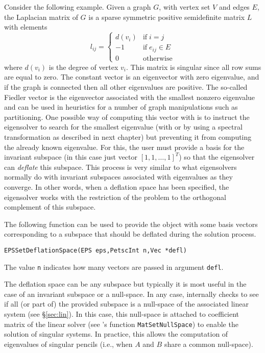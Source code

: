 	Consider the following example. Given a graph $G$, with vertex set $V$ and edges $E$, the Laplacian matrix of $G$ is a sparse symmetric positive semidefinite matrix $L$ with elements
$$l_{ij}=\left\{\begin{array}{cl}
         d(v_i) & \mathrm{if}\;i=j\\
         -1 & \mathrm{if}\;e_{ij}\in E\\
         0&\mathrm{otherwise}
\end{array}\right.$$
where $d(v_i)$ is the degree of vertex $v_i$. This matrix is singular since all row sums are equal to zero. The constant vector is an eigenvector with zero eigenvalue, and if the graph is connected then all other eigenvalues are positive. The so-called Fiedler vector is the eigenvector associated with the smallest nonzero eigenvalue and can be used in heuristics for a number of graph manipulations such as partitioning. One possible way of computing this vector with \slepc is to instruct the eigensolver to search for the smallest eigenvalue (with  or by using a spectral transformation as described in next chapter) but preventing it from computing the already known eigenvalue. For this, the user must provide a basis for the invariant subspace (in this case just vector $[1,1,\ldots,1]^T$) so that the eigensolver can \emph{deflate} this subspace. This process is very similar to what eigensolvers normally do with invariant subspaces associated with eigenvalues as they converge. In other words, when a deflation space has been specified, the eigensolver works with the restriction of the problem to the orthogonal complement of this subspace.

	The following function can be used to provide the  object with some basis vectors corresponding to a subspace that should be deflated during the solution process.
	\begin{Verbatim}[fontsize=\small]
	EPSSetDeflationSpace(EPS eps,PetscInt n,Vec *defl)
	\end{Verbatim}
The value \texttt{n} indicates how many vectors are passed in argument \texttt{defl}.

	The deflation space can be any subspace but typically it is most useful in the case of an invariant subspace or a null-space. In any case, \slepc internally checks to see if all (or part of) the provided subspace is a null-space of the associated linear system (see \S\ref{sec:lin}). In this case, this null-space is attached to coefficient matrix of the linear solver (see \petsc's function \texttt{MatSetNullSpace}) to enable the solution of singular systems. In practice, this allows the computation of eigenvalues of singular pencils (i.e., when $A$ and $B$ share a common null-space).

